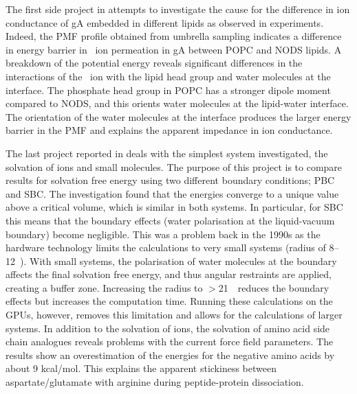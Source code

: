 The first side project in  attempts to investigate the cause for the difference 
in ion conductance of gA embedded in different lipids as observed in experiments. Indeed, the 
PMF profile obtained from umbrella sampling indicates a difference in energy barrier in \K\ 
ion permeation in gA between POPC and NODS lipids. A breakdown of the potential energy reveals 
significant differences in the interactions of the \K\ ion with the lipid head group and water 
molecules at the interface. The phosphate head group in POPC has a stronger dipole moment 
compared to NODS, and this orients water molecules at the lipid-water interface. The orientation 
of the water molecules at the interface produces the larger energy barrier in the PMF and 
explains the apparent impedance in ion conductance.

The last project reported in  deals with the simplest system investigated, 
the solvation of ions and small molecules. The purpose of this project is to compare results 
for solvation free energy using two different boundary conditions; PBC and SBC. The 
investigation found that the energies converge to a unique value above a critical volume, 
which is similar in both systems. In particular, for SBC this means that the boundary effects 
(water polarisation at the liquid-vacuum boundary) become negligible. This was a problem back 
in the 1990s as the hardware technology limits the calculations to very small systems (radius 
of 8--12~\angs). With small systems, the polarisation of water molecules at the boundary affects 
the final solvation free energy, and thus angular restraints are applied, creating a buffer zone. 
Increasing the radius to $>$21~\angs\ reduces the boundary effects but increases the computation 
time. Running these calculations on the GPUs, however, removes this limitation and allows for 
the calculations of larger systems. In addition to the solvation of ions, the solvation of amino 
acid side chain analogues reveals problems with the current force field parameters. The results 
show an overestimation of the energies for the negative amino acids by about 9 kcal/mol. This 
explains the apparent stickiness between aspartate/glutamate with arginine during peptide-protein 
dissociation.

